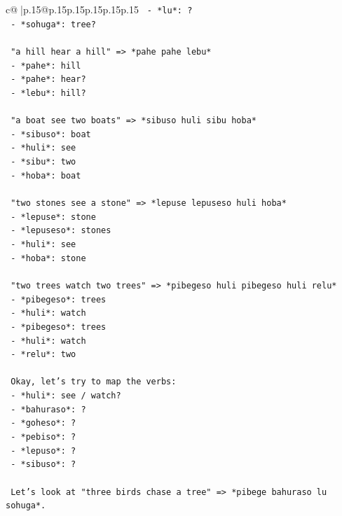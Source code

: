\documentclass{article}
\begin{document}
{\begin{supertabular}{c@{$\;$}|p{.15\linewidth}@{}p{.15\linewidth}p{.15\linewidth}p{.15\linewidth}p{.15\linewidth}p{.15\linewidth}}
{{{\texttt{   {-} *lu*: ?} \\
\texttt{   {-} *sohuga*: tree?} \\
\\ 
\texttt{   "a hill hear a hill" => *pahe pahe lebu*} \\
\texttt{   {-} *pahe*: hill} \\
\texttt{   {-} *pahe*: hear?} \\
\texttt{   {-} *lebu*: hill?} \\
\\ 
\texttt{   "a boat see two boats" => *sibuso huli sibu hoba*} \\
\texttt{   {-} *sibuso*: boat} \\
\texttt{   {-} *huli*: see} \\
\texttt{   {-} *sibu*: two} \\
\texttt{   {-} *hoba*: boat} \\
\\ 
\texttt{   "two stones see a stone" => *lepuse lepuseso huli hoba*} \\
\texttt{   {-} *lepuse*: stone} \\
\texttt{   {-} *lepuseso*: stones} \\
\texttt{   {-} *huli*: see} \\
\texttt{   {-} *hoba*: stone} \\
\\ 
\texttt{   "two trees watch two trees" => *pibegeso huli pibegeso huli relu*} \\
\texttt{   {-} *pibegeso*: trees} \\
\texttt{   {-} *huli*: watch} \\
\texttt{   {-} *pibegeso*: trees} \\
\texttt{   {-} *huli*: watch} \\
\texttt{   {-} *relu*: two} \\
\\ 
\texttt{   Okay, let's try to map the verbs:} \\
\texttt{   {-} *huli*: see / watch?} \\
\texttt{   {-} *bahuraso*: ?} \\
\texttt{   {-} *goheso*: ?} \\
\texttt{   {-} *pebiso*: ?} \\
\texttt{   {-} *lepuso*: ?} \\
\texttt{   {-} *sibuso*: ?} \\
\\ 
\texttt{   Let's look at "three birds chase a tree" => *pibege bahuraso lu sohuga*.} \\
}}}
\end{supertabular}}
\end{document}
